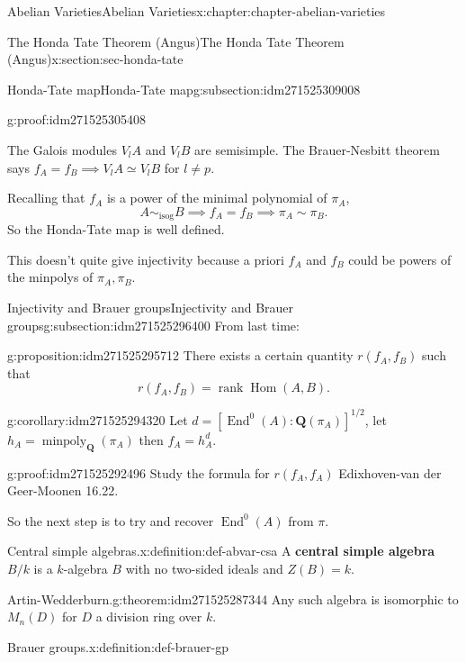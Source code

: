 \documentclass[oneside,10pt,]{book}
\newcommand{\terminology}[1]{\textbf{#1}}
\numberwithin{equation}{section}
\newcommand{\lb}{[}
\newcommand{\rb}{]}
\newcommand{\QQ}{\mathbf{Q}}
\DeclareMathOperator{\End}{End}
\DeclareMathOperator{\Hom}{Hom}
\DeclareMathOperator{\rank}{rank}
\begin{document}
\begin{chapterptx}{Abelian Varieties}{}{Abelian Varieties}{}{}{x:chapter:chapter-abelian-varieties}
\begin{sectionptx}{The Honda Tate Theorem (Angus)}{}{The Honda Tate Theorem (Angus)}{}{}{x:section:sec-honda-tate}
\begin{subsectionptx}{Honda-Tate map}{}{Honda-Tate map}{}{}{g:subsection:idm271525309008}
\begin{proofptx}{}{g:proof:idm271525305408}
\par
The Galois modules \(V_lA\) and \(V_l B\) are semisimple. The Brauer-Nesbitt theorem says \(f_A = f_B \implies V_lA \simeq V_lB \) for \(l\ne p\).%
\end{proofptx}
Recalling that \(f_A\) is a power of the minimal polynomial of \(\pi_A\),%
\begin{equation*}
A \sim_{\text{isog}} B\implies  f_A =f_B \implies \pi_A \sim \pi_B\text{.}
\end{equation*}
So the Honda-Tate map is well defined.%
\par
This doesn't quite give injectivity because a priori \(f_A\) and \(f_B\) could be powers of the minpolys of \(\pi_A, \pi_B\).%
\end{subsectionptx}
%
%
\typeout{************************************************}
\typeout{************************************************}
%
\begin{subsectionptx}{Injectivity and Brauer groups}{}{Injectivity and Brauer groups}{}{}{g:subsection:idm271525296400}
From last time:%
\begin{proposition}{}{}{g:proposition:idm271525295712}%
There exists a certain quantity \(r(f_A, f_B)\) such that%
\begin{equation*}
r(f_A, f_B) = \rank \Hom(A,B)\text{.}
\end{equation*}
%
\end{proposition}
\begin{corollary}{}{}{g:corollary:idm271525294320}%
Let \(d = \lb \End^0(A) : \QQ(\pi_A) \rb^{1/2}\), let \(h_A = \operatorname{minpoly}_\QQ(\pi_A)\) then \(f_A = h_A^d\).%
\end{corollary}
\begin{proofptx}{}{g:proof:idm271525292496}
Study the formula for \(r(f_A, f_A)\) Edixhoven-van der Geer-Moonen 16.22.%
\end{proofptx}
So the next step is to try and recover \(\End^0(A)\) from \(\pi\).%
\begin{definition}{Central simple algebras.}{x:definition:def-abvar-csa}%
A \terminology{central simple algebra} \(B/k\) is a \(k\)-algebra \(B\) with no two-sided ideals and \(Z(B) = k\).%
\end{definition}
\begin{theorem}{Artin-Wedderburn.}{}{g:theorem:idm271525287344}%
Any such algebra is isomorphic to \(M_n(D)\) for \(D\) a division ring over \(k\).%
\end{theorem}
\begin{definition}{Brauer groups.}{x:definition:def-brauer-gp}%

\end{definition}
\end{subsectionptx}
\end{sectionptx}
\end{chapterptx}
\end{document}
